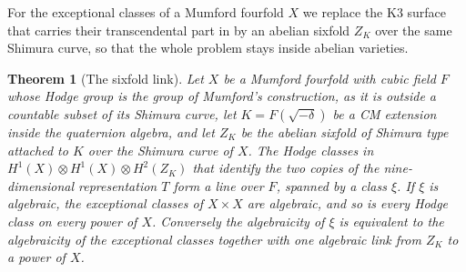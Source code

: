 \documentclass[11pt,reqno]{amsart}
\numberwithin{equation}{section}
\theoremstyle{plain}
\newtheorem{theorem}{Theorem}[section]
\theoremstyle{definition}
\begin{document}
For the exceptional classes of a Mumford fourfold $X$ we replace the K3 surface that carries their transcendental part in \cite{BMB26} by an abelian sixfold $Z_{K}$ over the same Shimura curve, so that the whole problem stays inside abelian varieties.

\begin{theorem}[The sixfold link]\label{thm:intro-link}
Let $X$ be a Mumford fourfold with cubic field $F$ whose Hodge group is the group of Mumford's construction, as it is outside a countable subset of its Shimura curve, let $K=F(\sqrt{-\delta})$ be a CM extension inside the quaternion algebra, and let $Z_{K}$ be the abelian sixfold of Shimura type attached to $K$ over the Shimura curve of $X$. The Hodge classes in $H^{1}(X)\otimes H^{1}(X)\otimes H^{2}(Z_{K})$ that identify the two copies of the nine-dimensional representation $T$ form a line over $F$, spanned by a class $\xi$. If $\xi$ is algebraic, the exceptional classes of $X\times X$ are algebraic, and so is every Hodge class on every power of $X$. Conversely the algebraicity of $\xi$ is equivalent to the algebraicity of the exceptional classes together with one algebraic link from $Z_{K}$ to a power of $X$.
\end{theorem}
\end{document}
